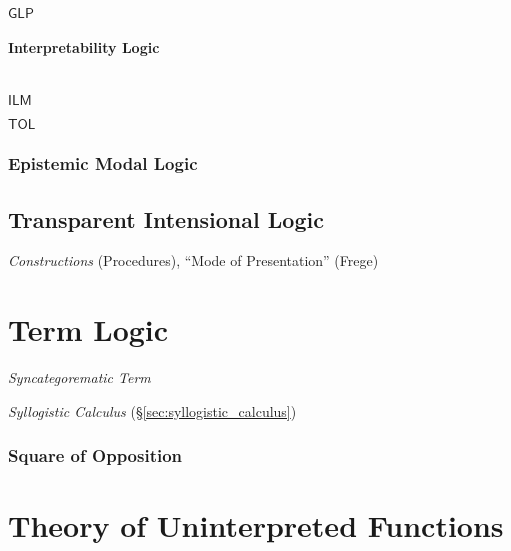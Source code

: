 $\mathsf{GLP}$



\paragraph{Interpretability Logic}\label{sec:interpretability_logic}
\hfill \\

$\mathsf{ILM}$

$\mathsf{TOL}$



\subsubsection{Epistemic Modal Logic}\label{sec:epistemic_logic}



\subsection{Transparent Intensional Logic}
\label{sec:transparent_intensional_logic}

\emph{Constructions} (Procedures), ``Mode of Presentation'' (Frege)



\section{Term Logic}\label{sec:term_logic}

\emph{Syncategorematic Term}

\emph{Syllogistic Calculus} (\S\ref{sec:syllogistic_calculus})



\subsubsection{Square of Opposition}\label{sec:square_of_opposition}



\section{Theory of Uninterpreted Functions}
\label{sec:uninterpreted_function}

